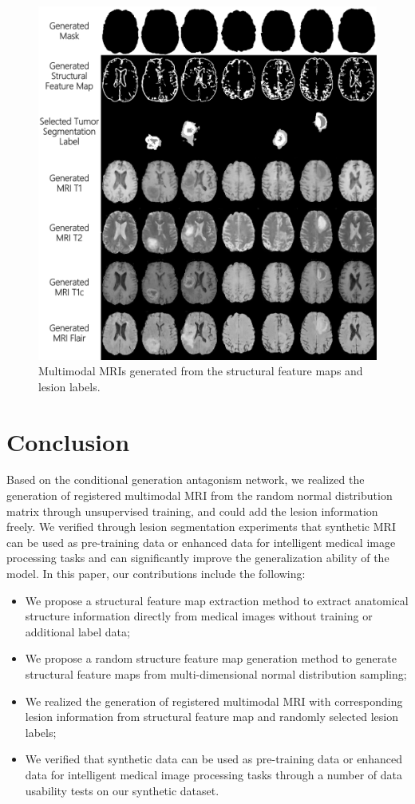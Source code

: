 \documentclass[letterpaper]{article} %
\begin{document}
\begin{figure}
	\centering
	\includegraphics[width=0.8\linewidth]{figures/F_to_MRI}
	\caption{Multimodal MRIs generated from the structural feature maps and lesion labels.}
	\label{generated_mri}
\end{figure}

\section{Conclusion}
Based on the conditional generation antagonism network, we realized the generation of registered multimodal MRI from the random normal distribution matrix through unsupervised training, and could add the lesion information freely. 
We verified through lesion segmentation experiments that synthetic MRI can be used as pre-training data or enhanced data for intelligent medical image processing tasks and can significantly improve the generalization ability of the model.
In this paper, our contributions include the following:
\begin{itemize}
	\item We propose a structural feature map extraction method to extract anatomical structure information directly from medical images without training or additional label data;
	\item We propose a random structure feature map generation method to generate structural feature maps from multi-dimensional normal distribution sampling;
	\item We realized the generation of registered multimodal MRI with corresponding lesion information from structural feature map and randomly selected lesion labels;
	\item We verified that synthetic data can be used as pre-training data or enhanced data for intelligent medical image processing tasks through a number of data usability tests on our synthetic dataset.
	
\end{itemize}
\end{document}
